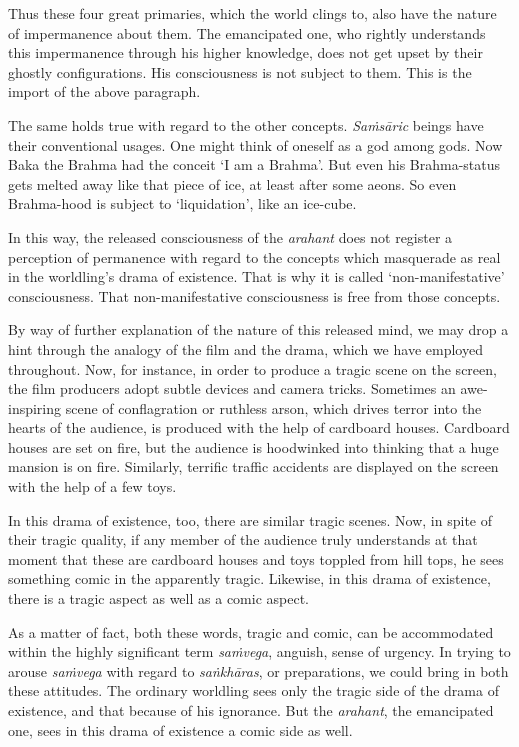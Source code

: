 Thus these four great primaries, which the world clings to, also have the nature of impermanence about them. The emancipated one, who rightly understands this impermanence through his higher knowledge, does not get upset by their ghostly configurations. His consciousness is not subject to them. This is the import of the above paragraph.

The same holds true with regard to the other concepts. \emph{Saṁsāric} beings have their conventional usages. One might think of oneself as a god among gods. Now Baka the Brahma had the conceit `I am a Brahma'. But even his Brahma-status gets melted away like that piece of ice, at least after some aeons. So even Brahma-hood is subject to `liquidation', like an ice-cube.

In this way, the released consciousness of the \emph{arahant} does not register a perception of permanence with regard to the concepts which masquerade as real in the worldling's drama of existence. That is why it is called `non-manifestative' consciousness. That non-manifestative consciousness is free from those concepts.

By way of further explanation of the nature of this released mind, we may drop a hint through the analogy of the film and the drama, which we have employed throughout. Now, for instance, in order to produce a tragic scene on the screen, the film producers adopt subtle devices and camera tricks. Sometimes an awe-inspiring scene of conflagration or ruthless arson, which drives terror into the hearts of the audience, is produced with the help of cardboard houses. Cardboard houses are set on fire, but the audience is hoodwinked into thinking that a huge mansion is on fire. Similarly, terrific traffic accidents are displayed on the screen with the help of a few toys.

In this drama of existence, too, there are similar tragic scenes. Now, in spite of their tragic quality, if any member of the audience truly understands at that moment that these are cardboard houses and toys toppled from hill tops, he sees something comic in the apparently tragic. Likewise, in this drama of existence, there is a tragic aspect as well as a comic aspect.

As a matter of fact, both these words, tragic and comic, can be accommodated within the highly significant term \emph{saṁvega}, anguish, sense of urgency. In trying to arouse \emph{saṁvega} with regard to \emph{saṅkhāras}, or preparations, we could bring in both these attitudes. The ordinary worldling sees only the tragic side of the drama of existence, and that because of his ignorance. But the \emph{arahant}, the emancipated one, sees in this drama of existence a comic side as well.

